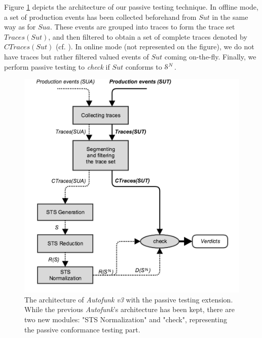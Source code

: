 Figure \ref{fig:passive-autofunk} depicts the architecture of our
passive testing technique. In offline mode, a set of production
events has been collected beforehand from $\mathit{Sut}$ in the
same way as for $\mathit{Sua}$. These events are grouped into
traces to form the trace set $Traces({Sut})$, and then filtered
to obtain a set of complete traces denoted by $CTraces({Sut})$
(cf.
).
In online mode (not represented on the figure), we do not have
traces but rather filtered valued events of $\mathit{Sut}$ coming
on-the-fly. Finally, we perform passive testing to \emph{check}
if $\mathit{Sut}$ conforms to $\EuScript{S}^{N}$.

\begin{figure}[h]
    \begin{center}
        \includegraphics[width=1.0\linewidth]{figures/passive_autofunk.png}
    \end{center}

    \caption{The architecture of \textit{Autofunk v3} with the
    passive testing extension. While the previous
    \textit{Autofunk}'s architecture has been kept, there are
    two new modules: "STS Normalization" and "check",
    representing the passive conformance testing part.}
    \label{fig:passive-autofunk}
\end{figure}

